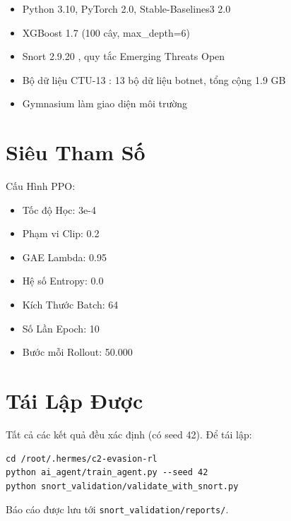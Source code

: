 \documentclass[12pt,a4paper]{report}
\begin{document}
\begin{itemize}
  \item Python 3.10, PyTorch 2.0, Stable-Baselines3 2.0 \cite{stable_baselines3}
  \item XGBoost 1.7 (100 cây, max\_depth=6) \cite{chen2016xgboost}
  \item Snort 2.9.20 \cite{snort_project}, quy tắc Emerging Threats Open \cite{emerging_threats}
  \item Bộ dữ liệu CTU-13 \cite{stratosphere_ctu13}: 13 bộ dữ liệu botnet, tổng cộng 1.9 GB
  \item Gymnasium làm giao diện môi trường \cite{gymnasium}
\end{itemize}

\section{Siêu Tham Số}

Cấu Hình PPO:
\begin{itemize}
  \item Tốc độ Học: 3e-4
  \item Phạm vi Clip: 0.2
  \item GAE Lambda: 0.95
  \item Hệ số Entropy: 0.0
  \item Kích Thước Batch: 64
  \item Số Lần Epoch: 10
  \item Bước mỗi Rollout: 50.000
\end{itemize}

\section{Tái Lập Được}

Tất cả các kết quả đều xác định (có seed 42). Để tái lập:

\begin{verbatim}
cd /root/.hermes/c2-evasion-rl
python ai_agent/train_agent.py --seed 42
python snort_validation/validate_with_snort.py
\end{verbatim}

Báo cáo được lưu tới \texttt{snort\_validation/reports/}.
\end{document}
